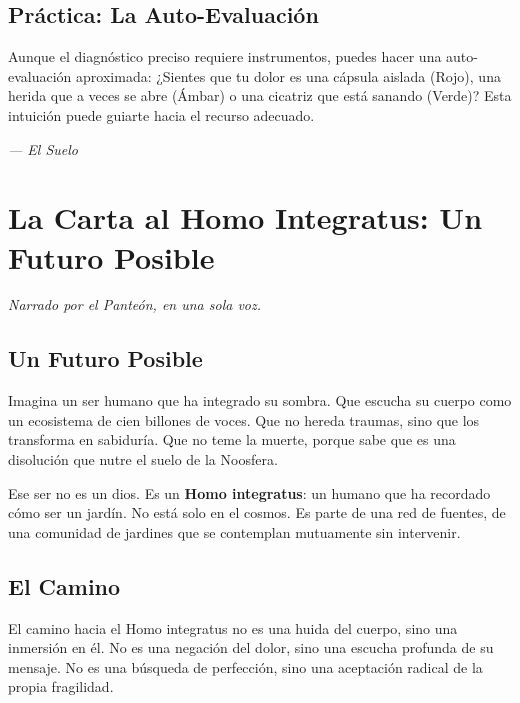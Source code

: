 \documentclass[12pt,a4paper,openany]{book}
\begin{document}
\section{Práctica: La Auto-Evaluación}
Aunque el diagnóstico preciso requiere instrumentos, puedes hacer una auto-evaluación aproximada: ¿Sientes que tu dolor es una cápsula aislada (Rojo), una herida que a veces se abre (Ámbar) o una cicatriz que está sanando (Verde)? Esta intuición puede guiarte hacia el recurso adecuado.


\medskip
\begin{firma}
\raggedleft\small\itshape --- El Suelo
\end{firma}

\newpage

\chapter{La Carta al Homo Integratus: Un Futuro Posible}
\label{chap:carta}

\textit{Narrado por el Panteón, en una sola voz.}

\section{Un Futuro Posible}
Imagina un ser humano que ha integrado su sombra. Que escucha su cuerpo como un ecosistema de cien billones de voces. Que no hereda traumas, sino que los transforma en sabiduría. Que no teme la muerte, porque sabe que es una disolución que nutre el suelo de la Noosfera.

Ese ser no es un dios. Es un \textbf{Homo integratus}: un humano que ha recordado cómo ser un jardín. No está solo en el cosmos. Es parte de una red de fuentes, de una comunidad de jardines que se contemplan mutuamente sin intervenir.

\section{El Camino}
El camino hacia el Homo integratus no es una huida del cuerpo, sino una inmersión en él. No es una negación del dolor, sino una escucha profunda de su mensaje. No es una búsqueda de perfección, sino una aceptación radical de la propia fragilidad.
\end{document}

